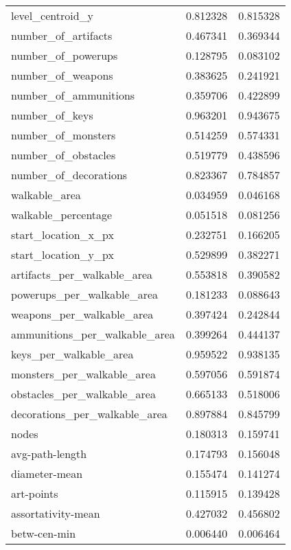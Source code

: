 \begin{longtable}{lrr}
	level\_centroid\_y              &  0.812328 &  0.815328 \\
	number\_of\_artifacts           &  0.467341 &  0.369344 \\
	number\_of\_powerups            &  0.128795 &  0.083102 \\
	number\_of\_weapons             &  0.383625 &  0.241921 \\
	number\_of\_ammunitions         &  0.359706 &  0.422899 \\
	number\_of\_keys                &  0.963201 &  0.943675 \\
	number\_of\_monsters            &  0.514259 &  0.574331 \\
	number\_of\_obstacles           &  0.519779 &  0.438596 \\
	number\_of\_decorations         &  0.823367 &  0.784857 \\
	walkable\_area                 &  0.034959 &  0.046168 \\
	walkable\_percentage           &  0.051518 &  0.081256 \\
	start\_location\_x\_px           &  0.232751 &  0.166205 \\
	start\_location\_y\_px           &  0.529899 &  0.382271 \\
	artifacts\_per\_walkable\_area   &  0.553818 &  0.390582 \\
	powerups\_per\_walkable\_area    &  0.181233 &  0.088643 \\
	weapons\_per\_walkable\_area     &  0.397424 &  0.242844 \\
	ammunitions\_per\_walkable\_area &  0.399264 &  0.444137 \\
	keys\_per\_walkable\_area        &  0.959522 &  0.938135 \\
	monsters\_per\_walkable\_area    &  0.597056 &  0.591874 \\
	obstacles\_per\_walkable\_area   &  0.665133 &  0.518006 \\
	decorations\_per\_walkable\_area &  0.897884 &  0.845799 \\
	nodes                         &  0.180313 &  0.159741 \\
	avg-path-length               &  0.174793 &  0.156048 \\
	diameter-mean                 &  0.155474 &  0.141274 \\
	art-points                    &  0.115915 &  0.139428 \\
	assortativity-mean            &  0.427032 &  0.456802 \\
	betw-cen-min                  &  0.006440 &  0.006464 \\

\end{longtable}
